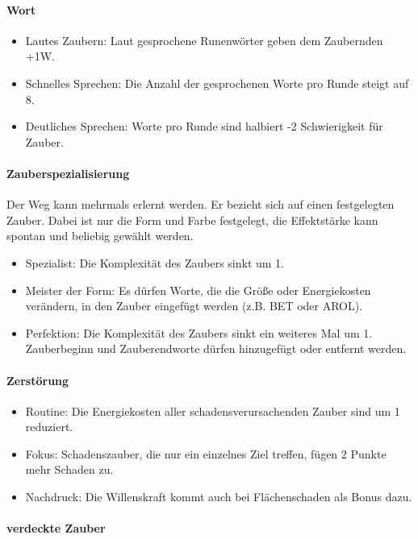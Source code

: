 \documentclass{article}
\begin{document}
\paragraph{Wort}

\begin{itemize}
\item Lautes Zaubern: Laut gesprochene Runenwörter geben dem Zaubernden +1W.
\item Schnelles Sprechen: Die Anzahl der gesprochenen Worte pro Runde steigt auf 8.
\item Deutliches Sprechen: Worte pro Runde sind halbiert -2 Schwierigkeit für Zauber.
\end{itemize}

\paragraph{Zauberspezialisierung}

Der Weg kann mehrmals erlernt werden. Er bezieht sich auf einen festgelegten Zauber. Dabei ist nur die Form und Farbe
festgelegt, die Effektstärke kann spontan und beliebig gewählt werden.

\begin{itemize}
\item Spezialist: Die Komplexität des Zaubers sinkt um 1.
\item Meister der Form: Es dürfen Worte, die die Größe oder Energiekosten verändern, in den Zauber eingefügt werden (z.B. BET oder AROL).
\item Perfektion: Die Komplexität des Zaubers sinkt ein weiteres Mal um 1. Zauberbeginn und Zauberendworte dürfen hinzugefügt oder entfernt werden.
\end{itemize}

\paragraph{Zerstörung}

\begin{itemize}
\item Routine: Die Energiekosten aller schadensverursachenden Zauber sind um 1 reduziert.
\item Fokus: Schadenszauber, die nur ein einzelnes Ziel treffen, fügen 2 Punkte mehr Schaden zu.
\item Nachdruck: Die Willenskraft kommt auch bei Flächenschaden als Bonus dazu.
\end{itemize}

\paragraph{verdeckte Zauber}
\end{document}
